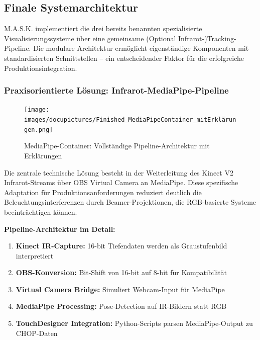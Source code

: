 
\subsection{Finale Systemarchitektur}

M.A.S.K. implementiert die drei bereits benannten spezialisierte Visualisierungssysteme über eine gemeinsame  (Optional Infrarot-)Tracking-Pipeline. Die modulare Architektur ermöglicht eigenständige Komponenten mit standardisierten Schnittstellen – ein entscheidender Faktor für die erfolgreiche Produktionsintegration.

\subsubsection{Praxisorientierte Lösung: Infrarot-MediaPipe-Pipeline}

\begin{figure}[h]
    \centering
    \texttt{[image: images/docupictures/Finished\_MediaPipeContainer\_mitErklärungen.png]}
    \caption{MediaPipe-Container: Vollständige Pipeline-Architektur mit Erklärungen}
    \label{fig:mediapipe_architecture}
\end{figure}

Die zentrale technische Lösung besteht in der Weiterleitung des Kinect V2 Infrarot-Streams über OBS Virtual Camera an MediaPipe. Diese spezifische Adaptation für Produktionsanforderungen reduziert deutlich die Beleuchtungsinterferenzen durch Beamer-Projektionen, die RGB-basierte Systeme beeinträchtigen können.

\textbf{Pipeline-Architektur im Detail:}
\begin{enumerate}
    \item \textbf{Kinect IR-Capture:} 16-bit Tiefendaten werden als Graustufenbild interpretiert
    \item \textbf{OBS-Konversion:} Bit-Shift von 16-bit auf 8-bit für Kompatibilität
    \item \textbf{Virtual Camera Bridge:} Simuliert Webcam-Input für MediaPipe
    \item \textbf{MediaPipe Processing:} Pose-Detection auf IR-Bildern statt RGB
    \item \textbf{TouchDesigner Integration:} Python-Scripts parsen MediaPipe-Output zu CHOP-Daten
\end{enumerate}

